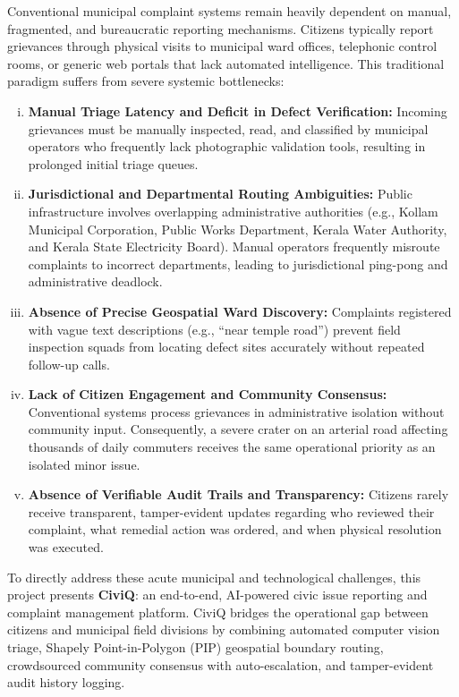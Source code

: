 \documentclass[12pt,a4paper]{report}
\begin{document}
Conventional municipal complaint systems remain heavily dependent on manual, fragmented, and bureaucratic reporting mechanisms. Citizens typically report grievances through physical visits to municipal ward offices, telephonic control rooms, or generic web portals that lack automated intelligence. This traditional paradigm suffers from severe systemic bottlenecks:
\begin{enumerate}[(i)]
    \item \textbf{Manual Triage Latency and Deficit in Defect Verification:} Incoming grievances must be manually inspected, read, and classified by municipal operators who frequently lack photographic validation tools, resulting in prolonged initial triage queues.
    \item \textbf{Jurisdictional and Departmental Routing Ambiguities:} Public infrastructure involves overlapping administrative authorities (e.g., Kollam Municipal Corporation, Public Works Department, Kerala Water Authority, and Kerala State Electricity Board). Manual operators frequently misroute complaints to incorrect departments, leading to jurisdictional ping-pong and administrative deadlock.
    \item \textbf{Absence of Precise Geospatial Ward Discovery:} Complaints registered with vague text descriptions (e.g., ``near temple road'') prevent field inspection squads from locating defect sites accurately without repeated follow-up calls.
    \item \textbf{Lack of Citizen Engagement and Community Consensus:} Conventional systems process grievances in administrative isolation without community input. Consequently, a severe crater on an arterial road affecting thousands of daily commuters receives the same operational priority as an isolated minor issue.
    \item \textbf{Absence of Verifiable Audit Trails and Transparency:} Citizens rarely receive transparent, tamper-evident updates regarding who reviewed their complaint, what remedial action was ordered, and when physical resolution was executed.
\end{enumerate}

To directly address these acute municipal and technological challenges, this project presents \textbf{CiviQ}: an end-to-end, AI-powered civic issue reporting and complaint management platform. CiviQ bridges the operational gap between citizens and municipal field divisions by combining automated computer vision triage, Shapely Point-in-Polygon (PIP) geospatial boundary routing, crowdsourced community consensus with auto-escalation, and tamper-evident audit history logging.
\end{document}
